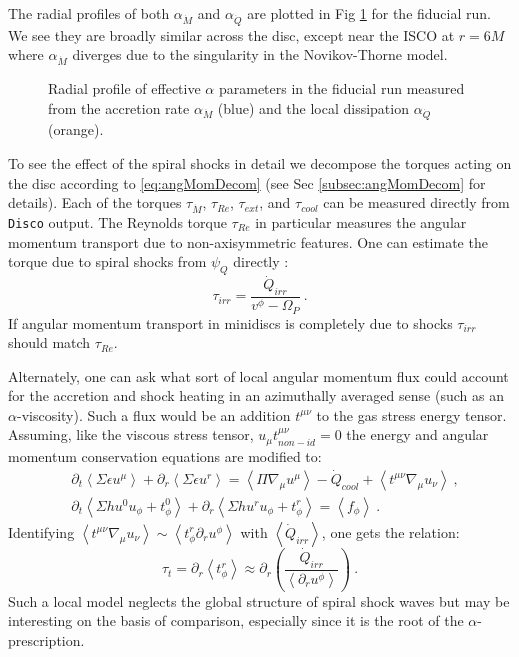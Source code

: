 \documentclass{emulateapj}
\newcommand{\al}{\alpha}
\newcommand{\eps}{\epsilon}
\newcommand{\Sig}{\Sigma}
\newcommand{\Om}{\Omega}
\newcommand{\Disco}{{\texttt{Disco}}}
\newcommand{\ave}[1]{\left \langle #1 \right \rangle}
\begin{document}
The radial profiles of both $\al_{\dot{M}}$ and $\al_{\dot{Q}}$ are plotted in Fig \ref{fi:alpha} for the fiducial run.  We see they are broadly similar across the disc, except near the ISCO at $r=6M$ where $\al_{\dot{M}}$ diverges due to the singularity in the Novikov-Thorne model.

\begin{figure}
\caption{\label{fi:alpha} Radial profile of effective $\al$ parameters in the fiducial run measured from the accretion rate $\al_{\dot{M}}$ (blue) and the local dissipation $\al_{\dot{Q}}$ (orange).}
\end{figure}

To see the effect of the spiral shocks in detail we decompose the torques acting on the disc according to \eqref{eq:angMomDecom} (see Sec \ref{subsec:angMomDecom} for details). Each of the torques $\tau_{\dot{M}}$, $\tau_{Re}$, $\tau_{ext}$, and $\tau_{cool}$ can be measured directly from \Disco{} output.  The Reynolds torque $\tau_{Re}$ in particular measures the angular momentum transport due to non-axisymmetric features.  One can estimate the torque due to spiral shocks from $\psi_Q$ directly \citep{Rafikov16}:
\begin{equation}
	\tau_{irr} = \frac{\dot{Q}_{irr}}{v^\phi - \Om_P} \ . \label{eq:tauRaf}
\end{equation}
If angular momentum transport in minidiscs is completely due to shocks $\tau_{irr}$ should match $\tau_{Re}$.

Alternately, one can ask what sort of local angular momentum flux could account for the accretion and shock heating in an azimuthally averaged sense (such as an $\al$-viscosity).  Such a flux would be an addition $t^{\mu\nu}$ to the gas stress energy tensor.  Assuming, like the viscous stress tensor, $u_\mu t^{\mu\nu}_{non-id} = 0$ the energy and angular momentum conservation equations are modified to:
\begin{align}
	&\partial_t \ave{\Sig \eps u^\mu} + \partial_r \ave{\Sig \eps u^r} = \ave{\Pi \nabla_\mu u^\mu} - \dot{Q}_{cool} + \ave{t^{\mu\nu} \nabla_\mu u_\nu} \ ,\\
	&\partial_t \ave{\Sig h u^0 u_\phi + t^0_\phi} + \partial_r \ave{\Sig h u^r u_\phi + t^r_\phi} = \ave{f_\phi} \ .
\end{align}
Identifying $\ave{t^{\mu\nu} \nabla_\mu u_\nu} \sim \ave{t^r_\phi \partial_r u^\phi}$ with $\ave{\dot{Q}_{irr}}$, one gets the relation:
\begin{equation}
	\tau_{t} = \partial_r \ave{t^r_\phi} \approx \partial_r \left(\frac{\dot{Q}_{irr}}{\ave{\partial_r u^\phi}} \right)\ . \label{eq:tauLoc}
\end{equation}
Such a local model neglects the global structure of spiral shock waves but may be interesting on the basis of comparison,  especially since it is the root of the $\alpha$-prescription.
\end{document}
